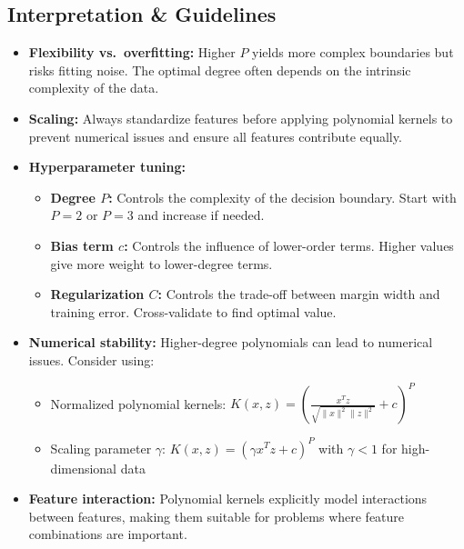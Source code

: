 \documentclass[11pt]{article}
\begin{document}
\subsection{Interpretation \& Guidelines}
\begin{itemize}
  \item \textbf{Flexibility vs.\ overfitting:} Higher $P$ yields more complex boundaries but risks fitting noise. The optimal degree often depends on the intrinsic complexity of the data.
  
  \item \textbf{Scaling:} Always standardize features before applying polynomial kernels to prevent numerical issues and ensure all features contribute equally.
  
  \item \textbf{Hyperparameter tuning:} 
    \begin{itemize}
        \item \textbf{Degree $P$:} Controls the complexity of the decision boundary. Start with $P=2$ or $P=3$ and increase if needed.
        \item \textbf{Bias term $c$:} Controls the influence of lower-order terms. Higher values give more weight to lower-degree terms.
        \item \textbf{Regularization $C$:} Controls the trade-off between margin width and training error. Cross-validate to find optimal value.
    \end{itemize}
  
  \item \textbf{Numerical stability:} Higher-degree polynomials can lead to numerical issues. Consider using:
    \begin{itemize}
        \item Normalized polynomial kernels: $K(x,z) = \left(\frac{x^Tz}{\sqrt{\|x\|^2\|z\|^2}} + c\right)^P$
        \item Scaling parameter $\gamma$: $K(x,z) = (\gamma x^Tz + c)^P$ with $\gamma < 1$ for high-dimensional data
    \end{itemize}
    
  \item \textbf{Feature interaction:} Polynomial kernels explicitly model interactions between features, making them suitable for problems where feature combinations are important.
\end{itemize}
\end{document}
